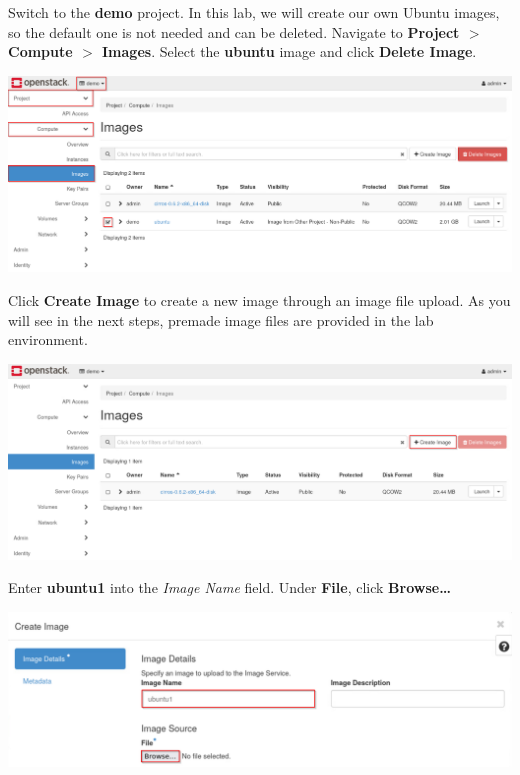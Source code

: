 \documentclass[letterpaper, 12pt]{article}
\begin{document}
\begin{enumerate}
    \begin{labstep}
        Switch to the \textbf{demo} project.
        In this lab, we will create our own Ubuntu images, so the default one is not needed and can be deleted.
        Navigate to \textbf{Project $>$ Compute $>$ Images}.
        Select the \textbf{ubuntu} image and click \textbf{Delete Image}.

        \begin{center}
            \includegraphics[width=\linewidth]{images/part1/step4.png}
        \end{center}
    \end{labstep}

    \begin{labstep}
        Click \textbf{Create Image} to create a new image through an image file upload.
        As you will see in the next steps, premade image files are provided in the lab environment.

        \begin{center}
            \includegraphics[width=\linewidth]{images/part1/step5.png}
        \end{center}
    \end{labstep}

    \begin{labstep}
        Enter \textbf{ubuntu1} into the \textit{Image Name} field.
        Under \textbf{File}, click \textbf{Browse…}

        \begin{center}
            \includegraphics[width=\linewidth]{images/part1/step6.png}
        \end{center}
    \end{labstep}


\end{enumerate}
\end{document}
